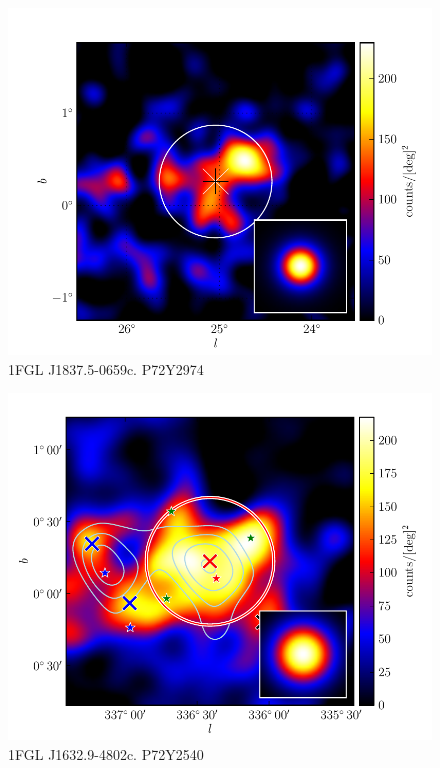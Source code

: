 \documentclass[preprint]{aastex}
\begin{document}
  \begin{figure}
    \begin{center}
      \includegraphics[type=pdf,ext=.pdf,read=.pdf]{source_plots/source_1FGL_J1837.5-0659c}
    \end{center}
    \caption{1FGL J1837.5-0659c. P72Y2974}
  \end{figure}


  \begin{figure}
    \begin{center}
      \includegraphics[type=pdf,ext=.pdf,read=.pdf]{source_plots/source_1FGL_J1632.9-4802c}
    \end{center}
    \caption{1FGL J1632.9-4802c. P72Y2540}
  \end{figure}
\end{document}

